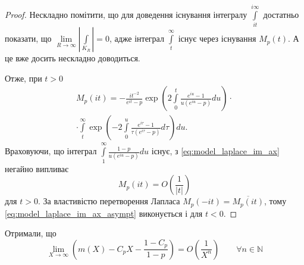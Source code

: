 \begin{lem}
\begin{proof}
Нескладно помітити, що для доведення існування інтегралу $\int\limits_{it}^{i\infty}$ достатньо показати, що $\lim\limits_{R \rightarrow \infty}|\int\limits_{K_{R}}| = 0$, адже інтеграл $\int\limits_{t}^{\infty}$ існує через існування $M_{p}(t)$.
А це вже досить нескладно доводиться. 

Отже, при $t>0$
\begin{equation}
\label{eq:model_laplace_im_ax}
\begin{split}
M_{p}(it) = -\frac{i t^{-2}}{e^{it}-p} \exp \left(2 \int\limits_{0}^{t} \frac{e^{iu} -1}{u(e^{iu} - p)} du\right) \cdot \\
\cdot \int\limits_t^\infty \exp\left(-2 \int\limits_{0}^{u} \frac{e^{i\tau} -1}{\tau(e^{i\tau} - p)} d\tau\right) du.
\end{split}
\end{equation}
Враховуючи, що інтеграл $\int\limits_{1}^{\infty} \frac{1-p}{u(e^{iu} - p)} du$ існує, з \eqref{eq:model_laplace_im_ax} негайно випливає
\begin{equation}
\label{eq:model_laplace_im_ax_asympt}
M_{p}(it) = O\left(\frac{1}{|t|}\right)
\end{equation}
для $t > 0$. За властивістю перетворення Лапласа $M_{p}(-it) = \overline{M_{p}(it)}$, тому \eqref{eq:model_laplace_im_ax_asympt} виконується і для $t < 0$.
\end{proof}
\end{lem}

Отримали, що
\begin{equation}
\label{eq:uniform_right_as_enhanced}
\lim\limits_{X \rightarrow \infty} \left( m(X) - C_{p} X - \frac{1 - C_{p}}{1 - p} \right) = O\left(\frac{1}{X^{n}}\right) \qquad \forall n \in \mathbb{N}
\end{equation}

